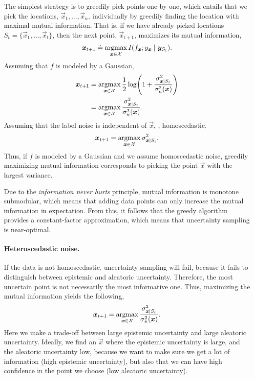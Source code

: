 The simplest strategy is to greedily pick points one by one, which entails
that we pick the locations, $\vec{x}_1,\ldots,\vec{x}_n$, individually by
greedily finding the location with maximal mutual information. That is, if we
have already picked locations $S_t = \{ \vec{x}_1,\ldots,\vec{x}_t \}$, then
the next point, $\vec{x}_{t+1}$, maximizes its mutual information, \[
    \bm{x}_{t+1} \doteq \operatorname*{argmax}_{\bm{x}\in\mathcal{X}} I(f_{\bm{x}};y_{\bm{x}}\mid\bm{y}_{S_t}).
\]
Assuming that $f$ is modeled by a Gaussian,
\begin{align*}
    \vec{x}_{t+1} & = \argmax_{\vec{x}\in\mathcal{X}} \frac{1}{2}\log\lft( 1+\frac{\sigma_{\vec{x}\mid S_t}^2}{\sigma_n^2(\vec{x})} \rgt) \\
                  & = \argmax_{\vec{x}\in\X} \frac{\sigma^2_{\vec{x}\mid S_t}}{\sigma_n^2(\vec{x})}.
\end{align*}
Assuming that the label noise is independent of $\vec{x}$, \ie, homoscedastic,
\[
    \bm{x}_{t+1} = \operatorname*{argmax}_{\bm{x}\in\mathcal{X}} \sigma_{\bm{x}\mid S_t}^2.
\]
Thus, if $f$ is modeled by a Gaussian and we assume homoscedastic noise,
greedily maximizing mutual information corresponds to picking the point
$\vec{x}$ with the largest variance.

Due to the \textit{information never hurts} principle, mutual information is
monotone submodular, which means that adding data points can only increase
the mutual information in expectation. From this, it follows that the greedy
algorithm provides a constant-factor approximation, which means that
uncertainty sampling is near-optimal.

\paragraph{Heteroscedastic noise.}

If the data is not homoscedastic, uncertainty sampling will fail, because it
fails to distinguish between epistemic and aleatoric uncertainty. Therefore,
the most uncertain point is not necessarily the most informative one. Thus,
maximizing the mutual information yields the following, \[
    \bm{x}_{t+1} = \operatorname*{argmax}_{\bm{x}\in\mathcal{X}} \frac{\sigma_{\bm{x}\mid S_t}^2}{\sigma_n^2(\bm{x})}.
\]
Here we make a trade-off between large epistemic uncertainty and large
aleatoric uncertainty. Ideally, we find an $\vec{x}$ where the epistemic
uncertainty is large, and the aleatoric uncertainty low, because we want to
make sure we get a lot of information (high epistemic uncertainty), but also
that we can have high confidence in the point we choose (low aleatoric
uncertainty).

